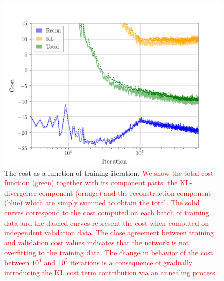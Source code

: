 \documentclass[%
showpacs,
nofootinbib,
 amsmath,amssymb,
 aps,
 twocolumn,
 prl,
 reprint,
floatfix,
]{revtex4-1}
\newcommand{\new}[1]{\textcolor{red}{#1}}
\begin{document}
%
%
\begin{figure}
    \includegraphics[width=\columnwidth]{inv_losses_log.png}
\caption{\label{fig:loss_log} The cost as a function of training iteration.
\new{We show the total cost function (green) together with its component parts:
the \ac{KL}-divergence component (orange) and the reconstruction component
(blue) which are simply summed to obtain the total. The solid curves correspond
to the cost computed on each batch of training data and the dashed curves
represent the cost when computed on independent validation data. The close
agreement between training and validation cost values indicates that the
network is not overfitting to the training data. The change in behavior of the
cost between $10^4$ and $10^5$ iterations is a consequence of gradually
introducing the \ac{KL} cost term contribution via an annealing process.}} 
\end{figure}
\end{document}
